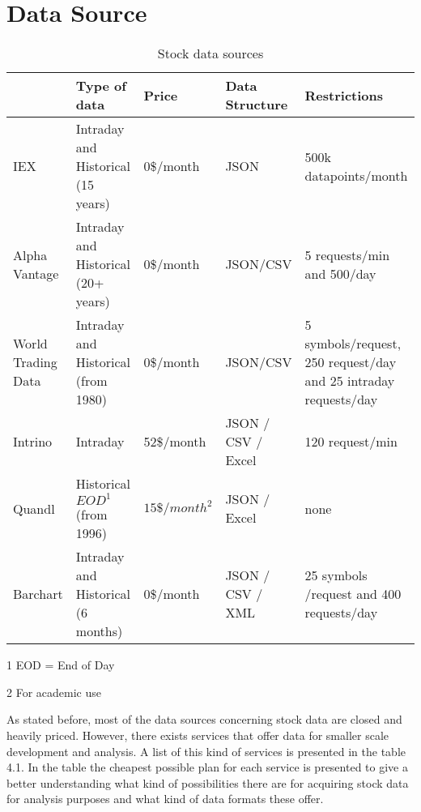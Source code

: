 \section{Data Source}

\begin{table}[! htbp]\centering 
    \caption{Stock data sources}
    \begin{threeparttable}
        \begin{tabular}{|p{2cm}|p{2.5cm}|l|p{2cm}|p{3cm}|} 
        \hline
        & Type of data & Price & Data Structure & Restrictions \\ \hline
        IEX \cite{iex}& Intraday and Historical (15 years) & 0\$/month & JSON & 500k datapoints/month \\ \hline
        Alpha Vantage \cite{alphavantage}  & Intraday and Historical (20+ years)& 0\$/month & JSON/CSV & 5 requests/min and 500/day\\ \hline
        World Trading Data \cite{worldtradingdata} & Intraday and Historical (from 1980) & 0\$/month & JSON/CSV & 5 symbols/request, 250 request/day and 25 intraday requests/day\\ \hline
        Intrino \cite{intrino} & Intraday & 52\$/month & JSON / CSV / Excel & 120 request/min\\ \hline
        Quandl \cite{quandl} & Historical $EOD^1$ (from 1996) & $15\$/month^2$ & JSON / Excel & none\\ \hline
        Barchart \cite{barchart} & Intraday and Historical (6 months) & 0\$/month & JSON / CSV / XML & 25 symbols /request and 400 requests/day\\
        \hline
        \end{tabular}
        \begin{tablenotes}\footnotesize
            \item[1] EOD = End of Day
            \item[2] For academic use 
        \end{tablenotes}
    \end{threeparttable}        
\end{table}

As stated before, most of the data sources concerning stock data are closed and heavily priced.
However, there exists services that offer data for smaller scale development and analysis.
A list of this kind of services is presented in the table 4.1.
In the table the cheapest possible plan for each service is presented to give a better understanding what kind of possibilities there are for acquiring stock data for analysis purposes and what kind of data formats these offer.


